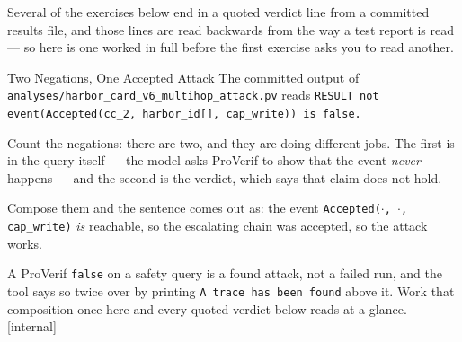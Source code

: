 \documentclass[11pt,a4paper]{article}
\theoremstyle{definition}
\begin{document}
Several of the exercises below end in a quoted verdict line from a committed results file, and those lines are read backwards from the way a test report is read --- so here is one worked in full before the first exercise asks you to read another.

\begin{pdexample}{Two Negations, One Accepted Attack}
\setlength{\parskip}{4pt plus 1pt}
The committed output of \texttt{analyses/harbor\_card\_v6\_}\allowbreak\texttt{multihop\_attack.pv}
reads \texttt{RESULT not event(Accepted(cc\_2, harbor\_id[], cap\_write)) is
false.}

Count the negations: there are two, and they are doing different jobs.
The first is in the query itself --- the model asks ProVerif to show that the
event \emph{never} happens --- and the second is the verdict, which says that
claim does not hold.

Compose them and the sentence comes out as: the event
\texttt{Accepted($\cdot$, $\cdot$, cap\_write)} \emph{is} reachable, so the
escalating chain was accepted, so the attack works.

A ProVerif
\texttt{false} on a safety query is a found attack, not a failed run, and the
tool says so twice over by printing \texttt{A trace has been found} above it.
Work that composition once here and every quoted verdict below reads at a
glance. [internal]
\end{pdexample}

\end{document}
